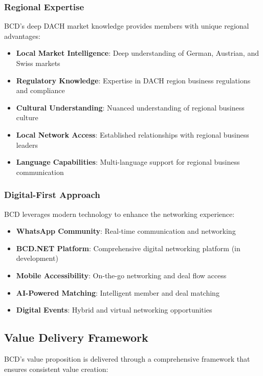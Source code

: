 \subsubsection{Regional Expertise}
BCD's deep DACH market knowledge provides members with unique regional advantages:

\begin{itemize}
    \item \textbf{Local Market Intelligence}: Deep understanding of German, Austrian, and Swiss markets
    \item \textbf{Regulatory Knowledge}: Expertise in DACH region business regulations and compliance
    \item \textbf{Cultural Understanding}: Nuanced understanding of regional business culture
    \item \textbf{Local Network Access}: Established relationships with regional business leaders
    \item \textbf{Language Capabilities}: Multi-language support for regional business communication
\end{itemize}

\subsubsection{Digital-First Approach}
BCD leverages modern technology to enhance the networking experience:

\begin{itemize}
    \item \textbf{WhatsApp Community}: Real-time communication and networking
    \item \textbf{BCD.NET Platform}: Comprehensive digital networking platform (in development)
    \item \textbf{Mobile Accessibility}: On-the-go networking and deal flow access
    \item \textbf{AI-Powered Matching}: Intelligent member and deal matching
    \item \textbf{Digital Events}: Hybrid and virtual networking opportunities
\end{itemize}

\subsection{Value Delivery Framework}

BCD's value proposition is delivered through a comprehensive framework that ensures consistent value creation:

